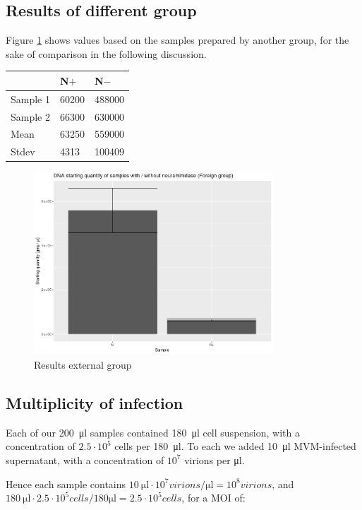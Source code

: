 \documentclass[a4paper,english]{scrreprt}
\begin{document}
\subsection{Results of different group}

Figure \ref{fig:sq_xx} shows values based on the samples prepared by another
group, for the sake of comparison in the following discussion.
\\

\begin{tabu}{lll}
	\toprule
	& N$+$ & N$-$ \\
	\midrule
	Sample 1 & 60200 & 488000 \\
	Sample 2 & 66300 & 630000 \\
	Mean & 63250 &  559000 \\
	Stdev & 4313 & 100409 \\
	\bottomrule
\end{tabu}

\begin{figure}
	\centering
	\includegraphics[width=0.8\textwidth]{img/sq_groupxx.png}
	\caption{Results external group}
	\label{fig:sq_xx}
\end{figure}

\subsection{Multiplicity of infection}

Each of our \SI{200}{\ul} samples contained \SI{180}{\ul} cell suspension, with
a concentration of $2.5 \cdot 10^5$ cells per \SI{180}{\ul}. To each we added
\SI{10}{\ul} MVM-infected supernatant, with a concentration of $10^7$ virions
per \si{\ul}.

Hence each sample contains $\SI{10}{\ul} \cdot 10^7 \si{virions \per \ul} =
10^8 \si{virions}$, and $\SI{180}{\ul} \cdot 2.5 \cdot 10^5 \si{cells \per 180 \ul}
= 2.5 \cdot 10^5 \si{cells}$, for a MOI of:
\end{document}
